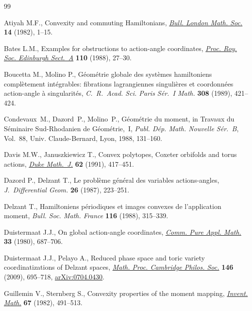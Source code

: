 \begin{thebibliography}{99}
\footnotesize \itemsep=0pt

Atiyah M.F., Convexity and commuting {H}amiltonians, \href{http://dx.doi.org/10.1112/blms/14.1.1}{\textit{Bull. London Math.
  Soc.}} \textbf{14} (1982), 1--15.

Bates L.M., Examples for obstructions to action-angle coordinates,
  \href{http://dx.doi.org/10.1017/S0308210500024823}{\textit{Proc. Roy. Soc. Edinburgh Sect.~A}} \textbf{110} (1988), 27--30.

Boucetta M., Molino P., G\'eom\'etrie globale des syst\`emes hamiltoniens
  compl\`etement int\'egrables: f\/ibrations lagrangiennes singuli\`eres et
  coordonn\'ees action-angle \`a singularit\'es, \textit{C.~R.~Acad. Sci. Paris
  S\'er.~I Math.} \textbf{308} (1989), 421--424.

Condevaux~M., Dazord~P.,  Molino~P.,
G\'eom\'etrie du moment,
in Travaux du {S}\'eminaire {S}ud-{R}hodanien de {G}\'eom\'etrie,~{I},
\textit{Publ. D\'ep. Math. Nouvelle S\'er.~B}, Vol.~88,
Univ. Claude-Bernard,
Lyon, 1988, 131--160.

Davis M.W., Januszkiewicz T., Convex polytopes, {C}oxeter orbifolds and torus
  actions, \href{http://dx.doi.org/10.1215/S0012-7094-91-06217-4}{\textit{Duke Math.~J.}} \textbf{62} (1991), 417--451.

Dazord P., Delzant T., Le probl\`eme g\'en\'eral des variables actions-angles,
  \textit{J.~Differential Geom.} \textbf{26} (1987), 223--251.

Delzant T., Hamiltoniens p\'eriodiques et images convexes de l'application
  moment, \textit{Bull. Soc. Math. France} \textbf{116} (1988), 315--339.

Duistermaat J.J., On global action-angle coordinates, \href{http://dx.doi.org/10.1002/cpa.3160330602}{\textit{Comm. Pure Appl.
  Math.}} \textbf{33} (1980), 687--706.

Duistermaat J.J., Pelayo A., Reduced phase space and toric variety
  coordinatizations of {D}elzant spaces, \href{http://dx.doi.org/10.1017/S0305004108002077}{\textit{Math. Proc. Cambridge Philos.
  Soc.}} \textbf{146} (2009), 695--718, \href{http://arxiv.org/abs/0704.0430}{arXiv:0704.0430}.

Guillemin V., Sternberg S., Convexity properties of the moment mapping,
  \href{http://dx.doi.org/10.1007/BF01398933}{\textit{Invent. Math.}} \textbf{67} (1982), 491--513.


\end{thebibliography}
